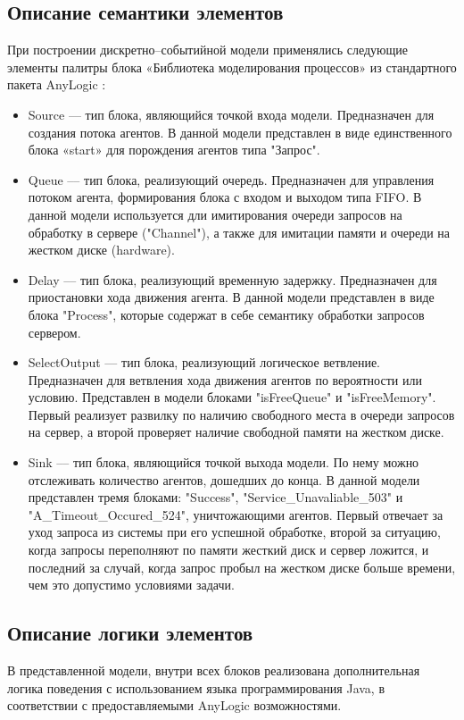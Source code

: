 \subsection{Описание семантики элементов}
При построении дискретно--событийной модели применялись следующие
элементы палитры блока «Библиотека моделирования процессов» из стандартного
пакета AnyLogic \cite{anylogic}:
\begin{itemize}
    \item Source –-- тип блока, являющийся точкой входа модели. Предназначен для
    создания потока агентов. В данной модели представлен в виде единственного
    блока «start» для порождения агентов типа "Запрос".
    \item Queue –-- тип блока, реализующий очередь. Предназначен для управления
    потоком агента, формирования блока с входом и выходом типа FIFO. В
    данной модели используется дли имитирования очереди запросов на
    обработку в сервере ("Channel"), а также для имитации памяти и очереди на жестком
    диске (hardware).
    \item Delay –-- тип блока, реализующий временную задержку. Предназначен для
    приостановки хода движения агента. В данной модели представлен в виде
    блока "Process", которые содержат в себе семантику обработки запросов
    сервером.
    \item SelectOutput --- тип блока, реализующий логическое ветвление.
    Предназначен для ветвления хода движения агентов по вероятности или
    условию. Представлен в модели блоками "isFreeQueue" и "isFreeMemory".
    Первый реализует развилку по наличию свободного места в очереди запросов на сервер,
    а второй проверяет наличие свободной памяти на жестком диске.
    \item Sink –-- тип блока, являющийся точкой выхода модели. По нему можно
    отслеживать количество агентов, дошедших до конца. В данной модели
    представлен тремя блоками: "Success", "Service\_Unavaliable\_503" и
    "A\_Timeout\_Occured\_524", уничтожающими агентов. Первый отвечает за уход запроса из системы при его
    успешной обработке, второй за ситуацию, когда запросы переполняют по памяти жесткий диск и
    сервер ложится, и последний за случай, когда запрос пробыл на жестком диске больше времени, чем это
    допустимо условиями задачи.
\end{itemize}

\subsection{Описание логики элементов}
В представленной модели, внутри всех блоков реализована дополнительная логика поведения
с использованием языка программирования Java, в соответствии с предоставляемыми AnyLogic
возможностями.

